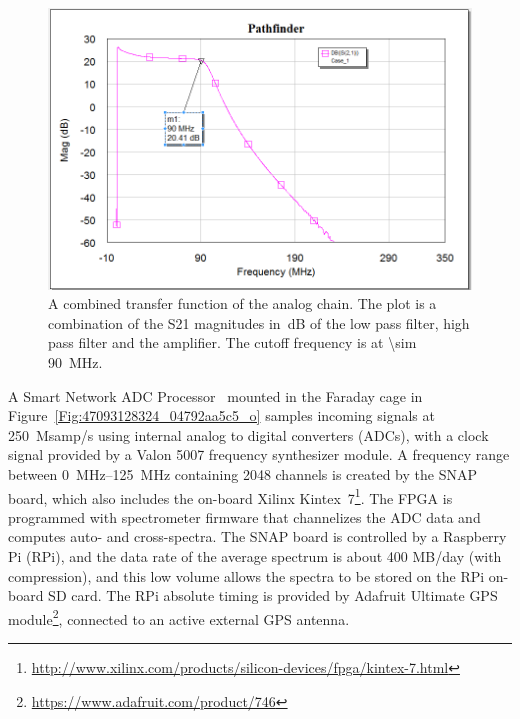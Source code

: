 \begin{figure}
	\centering
	\includegraphics[width=0.7\linewidth]{Figures/pathfinder.PNG}
	\caption{A combined transfer function of the analog chain. The plot is a combination of the S21 magnitudes in~dB of the low pass filter, high pass filter and the amplifier. The cutoff frequency is at \SI{\sim 90}{MHz}.}
	\label{Fig:path}
\end{figure}

A Smart Network ADC Processor~\citep[SNAP;][]{2016JAI.....541001H} mounted in the Faraday cage in Figure~\ref{Fig:47093128324_04792aa5c5_o} samples incoming signals at \SI{250}{Msamp/s} using internal analog to digital converters (ADCs), with a clock signal provided by a Valon 5007 frequency synthesizer module. A frequency range between \SIrange{0}{125}{\mega\hertz} containing 2048 channels is created by the SNAP board, which also includes the on-board Xilinx Kintex~7\footnote{\url{http://www.xilinx.com/products/silicon-devices/fpga/kintex-7.html}}. The FPGA is programmed with spectrometer firmware that channelizes the ADC data and computes auto- and cross-spectra. The SNAP board is controlled by a Raspberry Pi (RPi), and the data rate of the average spectrum is about 400 MB/day (with compression), and this low volume allows the spectra to be stored on the RPi on-board SD card. The RPi absolute timing is provided by Adafruit Ultimate GPS module\footnote{\url{https://www.adafruit.com/product/746}}, connected to an active external GPS antenna.

